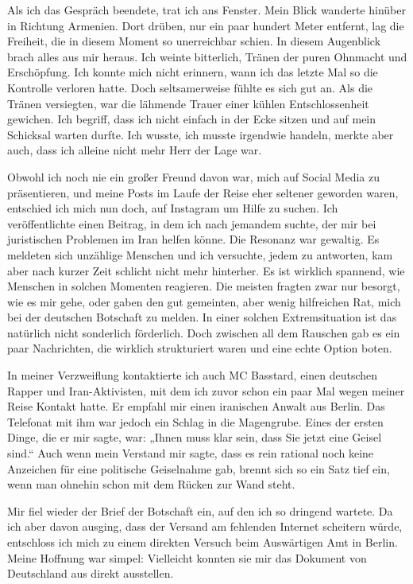Als ich das Gespräch beendete, trat ich ans Fenster. Mein Blick wanderte hinüber in Richtung Armenien. Dort drüben, nur ein paar hundert Meter entfernt, lag die Freiheit, die in diesem Moment so unerreichbar schien. In diesem Augenblick brach alles aus mir heraus. Ich weinte bitterlich, Tränen der puren Ohnmacht und Erschöpfung. Ich konnte mich nicht erinnern, wann ich das letzte Mal so die Kontrolle verloren hatte. Doch seltsamerweise fühlte es sich gut an. Als die Tränen versiegten, war die lähmende Trauer einer kühlen Entschlossenheit gewichen. Ich begriff, dass ich nicht einfach in der Ecke sitzen und auf mein Schicksal warten durfte. Ich wusste, ich musste irgendwie handeln, merkte aber auch, dass ich alleine nicht mehr Herr der Lage war.

Obwohl ich noch nie ein großer Freund davon war, mich auf Social Media zu präsentieren, und meine Posts im Laufe der Reise eher seltener geworden waren, entschied ich mich nun doch, auf Instagram um Hilfe zu suchen. Ich veröffentlichte einen Beitrag, in dem ich nach jemandem suchte, der mir bei juristischen Problemen im Iran helfen könne. Die Resonanz war gewaltig. Es meldeten sich unzählige Menschen und ich versuchte, jedem zu antworten, kam aber nach kurzer Zeit schlicht nicht mehr hinterher. Es ist wirklich spannend, wie Menschen in solchen Momenten reagieren. Die meisten fragten zwar nur besorgt, wie es mir gehe, oder gaben den gut gemeinten, aber wenig hilfreichen Rat, mich bei der deutschen Botschaft zu melden. In einer solchen Extremsituation ist das natürlich nicht sonderlich förderlich. Doch zwischen all dem Rauschen gab es ein paar Nachrichten, die wirklich strukturiert waren und eine echte Option boten.

In meiner Verzweiflung kontaktierte ich auch MC Basstard, einen deutschen Rapper und Iran-Aktivisten, mit dem ich zuvor schon ein paar Mal wegen meiner Reise Kontakt hatte. Er empfahl mir einen iranischen Anwalt aus Berlin. Das Telefonat mit ihm war jedoch ein Schlag in die Magengrube. Eines der ersten Dinge, die er mir sagte, war: „Ihnen muss klar sein, dass Sie jetzt eine Geisel sind.“ Auch wenn mein Verstand mir sagte, dass es rein rational noch keine Anzeichen für eine politische Geiselnahme gab, brennt sich so ein Satz tief ein, wenn man ohnehin schon mit dem Rücken zur Wand steht.

Mir fiel wieder der Brief der Botschaft ein, auf den ich so dringend wartete. Da ich aber davon ausging, dass der Versand am fehlenden Internet scheitern würde, entschloss ich mich zu einem direkten Versuch beim Auswärtigen Amt in Berlin. Meine Hoffnung war simpel: Vielleicht konnten sie mir das Dokument von Deutschland aus direkt ausstellen.

